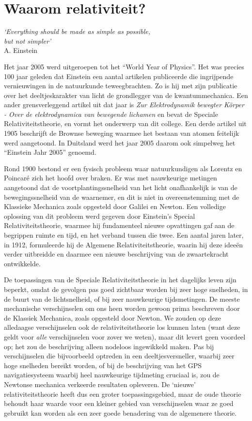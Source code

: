 \chapter{Waarom relativiteit?} 
\vspace{-1cm}\begin{flushright}
{\it `Everything should be made as simple as possible,\\ 
but not simpler'} \\ A. Einstein
\end{flushright}
Het jaar 2005 werd uitgeroepen tot het ``World Year of Physics''. Het was
precies 100 jaar geleden dat Einstein een aantal artikelen
publiceerde die ingrijpende vernieuwingen in de natuurkunde
teweegbrachten. Zo is hij met zijn publicatie over het
deeltjeskarakter van licht de grondlegger van de kwantummechanica. Een
ander grensverleggend artikel uit dat jaar is {\it Zur Elektrodynamik
bewegter K\"{o}rper - Over de elektrodynamica van bewegende lichamen}
en bevat de Speciale Relativiteitstheorie, en vormt het onderwerp van
dit college. Een derde artikel uit 1905 beschrijft de Brownse beweging
waarmee het bestaan van atomen feitelijk werd aangetoond. In Duitsland
werd het jaar 2005 daarom ook simpelweg het ``Einstein Jahr 2005''
genoemd.

Rond 1900 bestond er een fysisch probleem waar natuurkundigen als
 Lorentz en Poincar\'e zich het hoofd over braken. Er was met
 nauwkeurige metingen aangetoond dat de voortplantingssnelheid van het
 licht onafhankelijk is van de bewegingssnelheid van de waarnemer, en dit
 is niet in overeenstemming met de Klassieke Mechanica zoals opgesteld
 door Galilei en Newton.  Een volledige oplossing van dit probleem
 werd gegeven door Einstein's Special Relativiteitstheorie, waarmee
 hij fundamenteel nieuwe opvattingen gaf aan de begrippen ruimte en
 tijd, en het verband tussen die twee. Een aantal jaren later, in 1912,
 formuleerde hij de Algemene Relativiteitstheorie, waarin hij deze
 idee\"en verder uitbreidde en daarmee een nieuwe beschrijving van de
 zwaartekracht ontwikkelde.

De toepassingen van de Speciale Relativiteitstheorie in het dagelijks
leven zijn beperkt, omdat de gevolgen pas goed zichtbaar worden bij
zeer hoge snelheden, in de buurt van de lichtsnelheid, of bij zeer
nauwkeurige tijdsmetingen. De meeste mechanische verschijnselen om ons
heen worden gewoon prima beschreven door de Klassiek Mechanica, zoals
opgesteld door Newton. We zouden op deze alledaagse verschijnselen
ook de relativiteitstheorie los kunnen laten (want deze geldt voor
{\it alle} verschijnselen voor zover we weten), maar dit levert geen
voordeel op; het zou de beschrijving alleen nodeloos ingewikkeld
maken. Pas bij verschijnselen die bijvoorbeeld optreden in een
deeltjesversneller, waarbij zeer hoge snelheden bereikt worden, of bij de beschrijving van het
GPS navigatiesysteem waarbij heel nauwkeurige tijdmeting cruciaal is,
zou de Newtonse mechanica verkeerde resultaten opleveren. De `nieuwe'
relativiteitstheorie heeft dus een groter toepassingsgebied, maar de
oude theorie behoudt haar waarde voor een kleiner gebied van
verschijnselen waar ze goed gebruikt kan worden als een zeer goede
benadering van de algemenere theorie.

